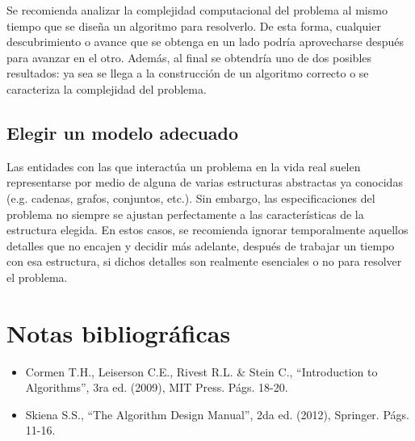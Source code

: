 Se recomienda analizar la complejidad computacional del problema al
mismo tiempo que se diseña un algoritmo para resolverlo. De esta forma,
cualquier descubrimiento o avance que se obtenga en un lado podría
aprovecharse después para avanzar en el otro. Además, al final se
obtendría uno de dos posibles resultados: ya sea se llega a la construcción
de un algoritmo correcto o se caracteriza la complejidad del problema.

\subsection{Elegir un modelo adecuado}

Las entidades con las que interactúa un problema en la vida real suelen
representarse por medio de alguna de varias estructuras abstractas
ya conocidas (e.g. cadenas, grafos, conjuntos, etc.). Sin embargo,
las especificaciones del problema no siempre se ajustan perfectamente
a las características de la estructura elegida. En estos casos, se
recomienda ignorar temporalmente aquellos detalles que no encajen
y decidir más adelante, después de trabajar un tiempo con esa estructura,
si dichos detalles son realmente esenciales o no para resolver el
problema. 

\section*{Notas bibliográficas}
\begin{itemize}
\item Cormen T.H., Leiserson C.E., Rivest R.L. \& Stein C., ``Introduction
to Algorithms'', 3ra ed. (2009), MIT Press. Págs. 18-20. 
\item Skiena S.S., ``The Algorithm Design Manual'', 2da ed. (2012), Springer.
Págs. 11-16.
\end{itemize}

